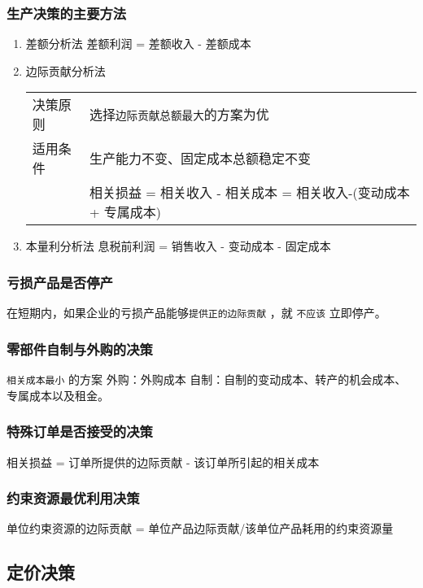 \documentclass[11pt]{article}
\begin{document}
\subsubsection{生产决策的主要方法}
\label{sec:orgda860c1}
\begin{enumerate}
\item 差额分析法
\label{sec:org0083d3a}
差额利润 = 差额收入 - 差额成本
\item 边际贡献分析法
\label{sec:org7fa07a9}
\begin{center}
\begin{tabular}{ll}
决策原则 & 选择\texttt{边际贡献总额最大}的方案为优\\
适用条件 & 生产能力不变、固定成本总额稳定不变\\
 & 相关损益 = 相关收入 - 相关成本 =  相关收入-(变动成本 + 专属成本)\\
\end{tabular}
\end{center}
\item 本量利分析法
\label{sec:org2d8e10a}
息税前利润 = 销售收入 - 变动成本 - 固定成本
\end{enumerate}
\subsubsection{亏损产品是否停产}
\label{sec:orge373275}
在短期内，如果企业的亏损产品能够\texttt{提供正的边际贡献} ，就 \texttt{不应该} 立即停产。
\subsubsection{零部件自制与外购的决策}
\label{sec:org03e73c0}
\texttt{相关成本最小} 的方案
外购：外购成本
自制：自制的变动成本、转产的机会成本、专属成本以及租金。
\subsubsection{特殊订单是否接受的决策}
\label{sec:org136b819}
相关损益 = 订单所提供的边际贡献 - 该订单所引起的相关成本
\subsubsection{约束资源最优利用决策}
\label{sec:org083fb11}
单位约束资源的边际贡献 = 单位产品边际贡献/该单位产品耗用的约束资源量
\subsection{定价决策}
\label{sec:orge511b24}
\end{document}
